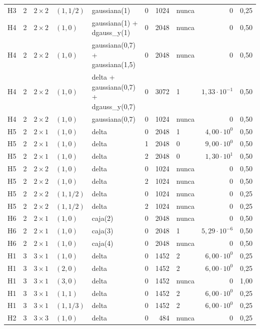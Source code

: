\begin{tabular}{llllllrlrr}
H3 & 2 & $2\times2$ & $(1, 1/2)$ & gaussiana(1) & 0 & 1024 & nunca & $0$ & 0,25 \\
H4 & 2 & $2\times2$ & $(1, 0)$ & gaussiana(1) + dgauss\_y(1) & 0 & 2048 & nunca & $0$ & 0,50 \\
H4 & 2 & $2\times2$ & $(1, 0)$ & gaussiana(0,7) + gaussiana(1,5) & 0 & 2048 & nunca & $0$ & 0,50 \\
H4 & 2 & $2\times2$ & $(1, 0)$ & delta + gaussiana(0,7) + dgauss\_y(0,7) & 0 & 3072 & 1 & $1{,}33 \cdot 10^{-1}$ & 0,50 \\
H4 & 2 & $2\times2$ & $(1, 0)$ & gaussiana(0,7) & 0 & 1024 & nunca & $0$ & 0,50 \\
H5 & 2 & $2\times1$ & $(1, 0)$ & delta & 0 & 2048 & 1 & $4{,}00 \cdot 10^{0}$ & 0,50 \\
H5 & 2 & $2\times1$ & $(1, 0)$ & delta & 1 & 2048 & 0 & $9{,}00 \cdot 10^{0}$ & 0,50 \\
H5 & 2 & $2\times1$ & $(1, 0)$ & delta & 2 & 2048 & 0 & $1{,}30 \cdot 10^{1}$ & 0,50 \\
H5 & 2 & $2\times2$ & $(1, 0)$ & delta & 0 & 1024 & nunca & $0$ & 0,50 \\
H5 & 2 & $2\times2$ & $(1, 0)$ & delta & 2 & 1024 & nunca & $0$ & 0,50 \\
H5 & 2 & $2\times2$ & $(1, 1/2)$ & delta & 0 & 1024 & nunca & $0$ & 0,25 \\
H5 & 2 & $2\times2$ & $(1, 1/2)$ & delta & 2 & 1024 & nunca & $0$ & 0,25 \\
H6 & 2 & $2\times1$ & $(1, 0)$ & caja(2) & 0 & 2048 & nunca & $0$ & 0,50 \\
H6 & 2 & $2\times1$ & $(1, 0)$ & caja(3) & 0 & 2048 & 1 & $5{,}29 \cdot 10^{-6}$ & 0,50 \\
H6 & 2 & $2\times1$ & $(1, 0)$ & caja(4) & 0 & 2048 & nunca & $0$ & 0,50 \\
H1 & 3 & $3\times1$ & $(1, 0)$ & delta & 0 & 1452 & 2 & $6{,}00 \cdot 10^{0}$ & 0,25 \\
H1 & 3 & $3\times1$ & $(2, 0)$ & delta & 0 & 1452 & 2 & $6{,}00 \cdot 10^{0}$ & 0,25 \\
H1 & 3 & $3\times1$ & $(3, 0)$ & delta & 0 & 1452 & nunca & $0$ & 1,00 \\
H1 & 3 & $3\times1$ & $(1, 1)$ & delta & 0 & 1452 & 2 & $6{,}00 \cdot 10^{0}$ & 0,25 \\
H1 & 3 & $3\times1$ & $(1, 1/3)$ & delta & 0 & 1452 & 2 & $6{,}00 \cdot 10^{0}$ & 0,25 \\
H2 & 3 & $3\times3$ & $(1, 0)$ & delta & 0 & 484 & nunca & $0$ & 0,25 \\

\end{tabular}
